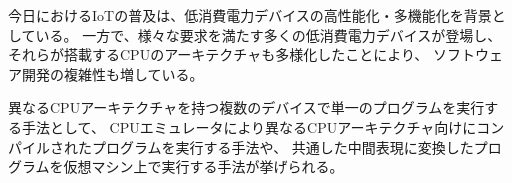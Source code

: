 \begin{jabstract}

今日におけるIoTの普及は、低消費電力デバイスの高性能化・多機能化を背景としている。
一方で、様々な要求を満たす多くの低消費電力デバイスが登場し、それらが搭載するCPUのアーキテクチャも多様化したことにより、
ソフトウェア開発の複雑性も増している。

異なるCPUアーキテクチャを持つ複数のデバイスで単一のプログラムを実行する手法として、
CPUエミュレータにより異なるCPUアーキテクチャ向けにコンパイルされたプログラムを実行する手法や、
共通した中間表現に変換したプログラムを仮想マシン上で実行する手法が挙げられる。


\end{jabstract}
